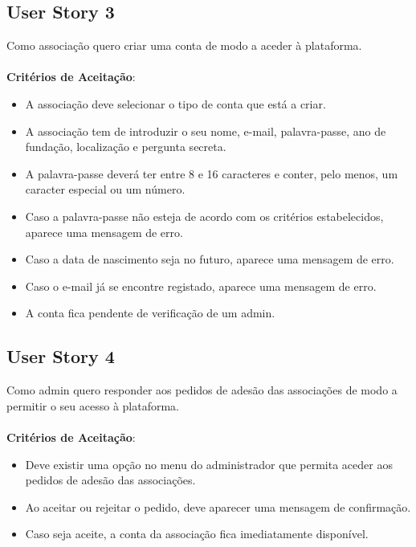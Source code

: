 \documentclass[a4paper,11pt]{article}
\begin{document}
\subsection{User Story 3}
Como associação quero criar uma conta de modo a aceder à plataforma.\\\\
\textbf{Critérios de Aceitação}:
\begin{itemize}
  \item A associação deve selecionar o tipo de conta que está a criar.
  \item A associação tem de introduzir o seu nome, e-mail, palavra-passe, ano de fundação, localização e pergunta secreta.
  \item A palavra-passe deverá ter entre 8 e 16 caracteres e conter, pelo menos, um caracter especial ou um número.
  \item Caso a palavra-passe não esteja de acordo com os critérios estabelecidos, aparece uma mensagem de erro.
  \item Caso a data de nascimento seja no futuro, aparece uma mensagem de erro.
  \item Caso o e-mail já se encontre registado, aparece uma mensagem de erro.
  \item A conta fica pendente de verificação de um admin.
\end{itemize}

\subsection{User Story 4}
Como admin quero responder aos pedidos de adesão das associações de modo a permitir o seu acesso à plataforma.\\\\
\textbf{Critérios de Aceitação}:
\begin{itemize}
  \item Deve existir uma opção no menu do administrador que permita aceder aos pedidos de adesão das associações.
  \item Ao aceitar ou rejeitar o pedido, deve aparecer uma mensagem de confirmação.
  \item Caso seja aceite, a conta da associação fica imediatamente disponível.
\end{itemize}
\end{document}

